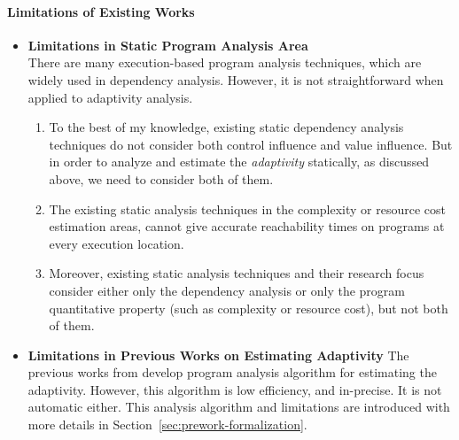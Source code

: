 \paragraph{Limitations of Existing Works}
\begin{itemize}
 \item \textbf{Limitations in Static Program Analysis Area}
 \\
 There are many execution-based program analysis techniques, which are widely used in dependency analysis. 
 However, it is not straightforward when applied to adaptivity analysis.
 \begin{enumerate}
 \item To the best of my knowledge,
 existing static dependency analysis techniques do not consider both control influence and value influence.
 But in order to analyze and estimate the \emph{adaptivity} statically, as discussed above, we need to consider both of them.
 \item The existing static analysis techniques in the complexity or resource cost estimation areas,
 cannot give accurate reachability times on programs 
 at every execution location.
 \item Moreover, existing static analysis techniques and their research focus consider
 either only the dependency analysis
 or only the program quantitative property (such as complexity or resource cost),
 but not both of them.
 \end{enumerate}
\item \textbf{Limitations in Previous Works on Estimating Adaptivity}
The previous works from \cite{weihao22}
develop program analysis algorithm for estimating the adaptivity.
However, this algorithm is low efficiency, and in-precise. It is not automatic either. 
This analysis algorithm and limitations are introduced with more details in Section~\ref{sec:prework-formalization}.
\end{itemize}

